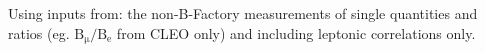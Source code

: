 \noindent Using inputs from: the non-B-Factory measurements of single quantities and ratios (eg. $\mathrm{B_\mu/B_e}$ from CLEO only) and including leptonic correlations only.

